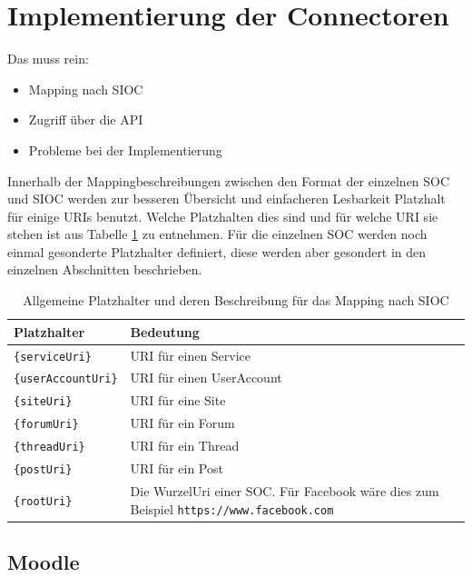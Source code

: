 \section{Implementierung der Connectoren} %
\label{sec:implementierung_der_connectoren}

Das muss rein:
\begin{itemize}
    \item Mapping nach SIOC
    \item Zugriff über die API
    \item Probleme bei der Implementierung
\end{itemize}

Innerhalb der Mappingbeschreibungen zwischen den Format der einzelnen SOC und SIOC werden zur besseren Übersicht und einfacheren Lesbarkeit Platzhalt für einige URIs benutzt. Welche Platzhalten dies sind und für welche URI sie stehen ist aus Tabelle \ref{tbl:platzhalter_fuer_sioc_mapping} zu entnehmen. Für die einzelnen SOC werden noch einmal gesonderte Platzhalter definiert, diese werden aber gesondert in den einzelnen Abschnitten beschrieben. 

\begin{table}[ht]
    \centering
    \caption{Allgemeine Platzhalter und deren Beschreibung für das Mapping nach SIOC}
    \begin{tabular}{l|p{11cm}}
        \textbf{Platzhalter} & \textbf{Bedeutung} \\ 
        \hline
        \texttt{\{serviceUri\}} & URI für einen Service \\
        \texttt{\{userAccountUri\}} & URI für einen UserAccount \\
        \texttt{\{siteUri\}} & URI für eine Site \\
        \texttt{\{forumUri\}} & URI für ein Forum \\
        \texttt{\{threadUri\}} & URI für ein Thread \\
        \texttt{\{postUri\}} & URI für ein Post \\
        \texttt{\{rootUri\}} & Die WurzelUri einer SOC. Für Facebook wäre dies zum Beispiel \texttt{https://www.facebook.com}
    \end{tabular}
    \label{tbl:platzhalter_fuer_sioc_mapping}
\end{table}

\subsection{Moodle} %
\label{sub:moodle_connector}

